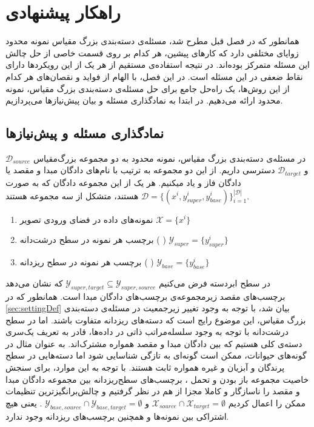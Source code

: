 \chapter{راهکار پیشنهادی}\label{Chap:Chap3}
\minitoc
\setcounter{footnote}{0}
\pagestyle{plain}

همانطور که در فصل قبل مطرح شد، مسئله‌ی دسته‌بندی بزرگ مقیاس نمونه محدود زوایای مختلفی دارد که کار‌های پیشین، هر کدام بر روی قسمت خاصی از حل چالش این مسئله متمرکز بوده‌اند. در نتیجه استفاده‌ی مستقیم از هر یک از این رویکرد‌ها دارای نقاط ضعفی در این مسئله است. در این فصل، با الهام از فواید و نقصان‌های هر کدام از این روش‌ها، یک راه‌حل جامع برای حل مسئله‌ی دسته‌بندی بزرگ مقیاس، نمونه محدود ارائه می‌دهیم. در ابتدا به نمادگذاری مسئله و بیان پیش‌نیاز‌ها می‌پردازیم.

\section{نمادگذاری مسئله و پیش‌نیازها} \label{sec:preliminaries}

در مسئله‌ی دسته‌بندی بزرگ مقیاس، نمونه محدود به دو مجموعه 
بزرگ‌مقیاس 
$\mathcal{D}_{source}$
و 
$\mathcal{D}_{target}$
دسترسی داریم. از این دو مجموعه به ترتیب با نام‌های دادگان مبدا و مقصد یا دادگان فاز 
 و
  یاد میکنیم. هر یک از این مجموعه دادگان که به صورت
  $\mathcal{D}=\{(x^i, y_{super}^i, y_{base}^i)\}_{i=1}^{|\mathcal{D}|}$
  هستند، متشکل از سه مجموعه هستند.
\begin{enumerate}
	\item
	نمونه‌‌های داده در فضای ورودی تصویر
	$\mathcal{X}=\{x^i\}$
	\item
	برچسب هر نمونه در سطح درشت‌دانه (
	)
	$\mathcal{Y}_{super}=\{y^i_{super}\}$
	\item 
	برچسب هر نمونه در سطح ریزدانه (
	)
	$\mathcal{Y}_{base}=\{y^i_{base}\}$
	
\end{enumerate}

در سطح ابردسته فرض می‌کنیم 
$\mathcal{Y}_{super,target} \subseteq \mathcal{Y}_{super, source}$
که نشان می‌دهد برچسب‌های مقصد زیرمجموعه‌ی برچسب‌های دادگان مبدا است. همانطور که در 
\ref{sec:settingDef}
بیان شد، با توجه به وجود تغییر زیرجمعیت در مسئله‌ی دسته‌بندی بزرگ مقیاس، این موضوع رایج است که دسته‌های ریزدانه متفاوت باشند. اما در سطح درشت‌دانه با توجه به وجود سلسله‌مراتب ذاتی در داده‌ها، قادر به تعریف یک‌سری دسته‌ی کلی هستیم که بین دادگان مبدا و مقصد همواره مشترک‌اند. به عنوان مثال در گونه‌‌های حیوانات، ممکن است گونه‌ای به تازگی شناسایی شود اما دسته‌هایی در سطح پرندگان و آبزیان و غیره همواره ثابت هستند. با توجه به این موارد، برای سنجش خاصیت مجموعه باز بودن و تحمل 
، برچسب‌های سطح‌ریزدانه بین مجموعه دادگان مبدا و مقصد را ناسازگار و کاملا مجزا از هم در نظر گرفتیم و چالش‌برانگیزترین تنظیمات ممکن را اعمال کردیم 
$\mathcal{X}_{source}\cap \mathcal{X}_{target}=\emptyset$ و
$\mathcal{Y}_{base,source}\cap \mathcal{Y}_{base,target}=\emptyset$
.
یعنی هیچ اشتراکی بین نمونه‌‌ها و همچنین برچسب‌های ریزدانه وجود ندارد.

